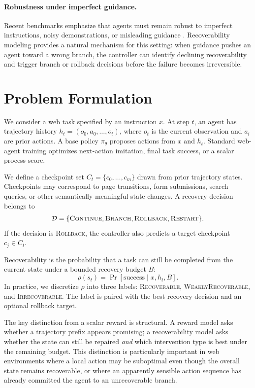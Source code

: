 \documentclass[11pt]{article}
\begin{document}
\paragraph{Robustness under imperfect guidance.}
Recent benchmarks emphasize that agents must remain robust to imperfect instructions, noisy demonstrations, or misleading guidance \citep{diao-etal-2025-guidebench,fu-etal-2026-beyond}. Recoverability modeling provides a natural mechanism for this setting: when guidance pushes an agent toward a wrong branch, the controller can identify declining recoverability and trigger branch or rollback decisions before the failure becomes irreversible.

\section{Problem Formulation}
We consider a web task specified by an instruction $x$. At step $t$, an agent has trajectory history $h_t = (o_0, a_0, \ldots, o_t)$, where $o_t$ is the current observation and $a_i$ are prior actions. A base policy $\pi_\theta$ proposes actions from $x$ and $h_t$. Standard web-agent training optimizes next-action imitation, final task success, or a scalar process score.

We define a checkpoint set $C_t = \{c_0, \ldots, c_m\}$ drawn from prior trajectory states. Checkpoints may correspond to page transitions, form submissions, search queries, or other semantically meaningful state changes. A recovery decision belongs to
\begin{equation}
\mathcal{D} = \{\textsc{Continue}, \textsc{Branch}, \textsc{Rollback}, \textsc{Restart}\}.
\end{equation}
If the decision is \textsc{Rollback}, the controller also predicts a target checkpoint $c_j \in C_t$.

Recoverability is the probability that a task can still be completed from the current state under a bounded recovery budget $B$:
\begin{equation}
\rho(s_t) = \Pr[\mathrm{success} \mid x, h_t, B].
\end{equation}
In practice, we discretize $\rho$ into three labels: \textsc{Recoverable}, \textsc{WeaklyRecoverable}, and \textsc{Irrecoverable}. The label is paired with the best recovery decision and an optional rollback target.

The key distinction from a scalar reward is structural. A reward model asks whether a trajectory prefix appears promising; a recoverability model asks whether the state can still be repaired \emph{and} which intervention type is best under the remaining budget. This distinction is particularly important in web environments where a local action may be suboptimal even though the overall state remains recoverable, or where an apparently sensible action sequence has already committed the agent to an unrecoverable branch.
\end{document}
